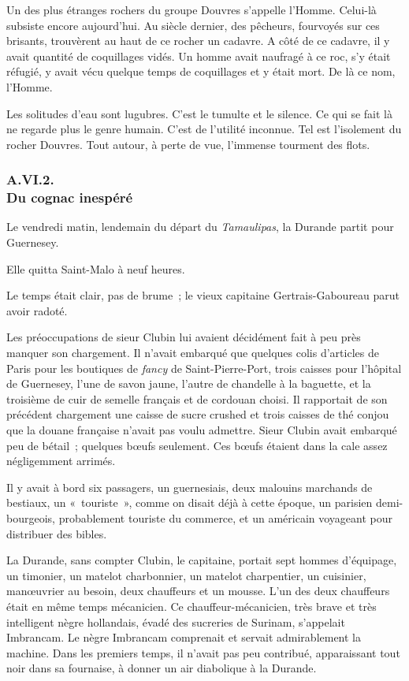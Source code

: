 \documentclass[french,twoside]{book} %
\begin{document}
 Un des plus étranges rochers du groupe Douvres s’appelle l’Homme. Celui-là subsiste encore aujourd’hui. Au siècle dernier, des pêcheurs, fourvoyés sur ces brisants, trouvèrent au haut de ce rocher un cadavre. A côté de ce cadavre, il y avait quantité de coquillages vidés. Un homme avait naufragé à ce roc, s’y était réfugié, y avait vécu quelque temps de coquillages et y était mort. De là ce nom, l’Homme.\par
Les solitudes d’eau sont lugubres. C’est le tumulte et le silence. Ce qui se fait là ne regarde plus le genre humain. C’est de l’utilité inconnue. Tel est l’isolement du rocher Douvres. Tout autour, à perte de vue, l’immense tourment des flots.
 \subsubsection[{A.VI.2. Du cognac inespéré}]{A.VI.2. \\
Du cognac inespéré}
\noindent Le vendredi matin, lendemain du départ du \emph{Tamaulipas}, la Durande partit pour Guernesey.\par
Elle quitta Saint-Malo à neuf heures.\par
Le temps était clair, pas de brume ; le vieux capitaine Gertrais-Gaboureau parut avoir radoté.\par
Les préoccupations de sieur Clubin lui avaient décidément fait à peu près manquer son chargement. Il n’avait embarqué que quelques colis d’articles de Paris pour les boutiques de \emph{fancy} de Saint-Pierre-Port, trois caisses pour l’hôpital de Guernesey, l’une de savon jaune, l’autre de chandelle à la baguette, et la troisième de cuir de semelle français et de cordouan choisi. Il rapportait de son précédent chargement une caisse de sucre crushed et trois caisses de thé conjou que la douane française n’avait pas voulu admettre. Sieur Clubin avait embarqué peu de bétail ; quelques bœufs seulement. Ces bœufs étaient dans la cale assez négligemment arrimés.\par
 Il y avait à bord six passagers, un guernesiais, deux malouins marchands de bestiaux, un « touriste », comme on disait déjà à cette époque, un parisien demi-bourgeois, probablement touriste du commerce, et un américain voyageant pour distribuer des bibles.\par
La Durande, sans compter Clubin, le capitaine, portait sept hommes d’équipage, un timonier, un matelot charbonnier, un matelot charpentier, un cuisinier, manœuvrier au besoin, deux chauffeurs et un mousse. L’un des deux chauffeurs était en même temps mécanicien. Ce chauffeur-mécanicien, très brave et très intelligent nègre hollandais, évadé des sucreries de Surinam, s’appelait Imbrancam. Le nègre Imbrancam comprenait et servait admirablement la machine. Dans les premiers temps, il n’avait pas peu contribué, apparaissant tout noir dans sa fournaise, à donner un air diabolique à la Durande.\par
\end{document}
